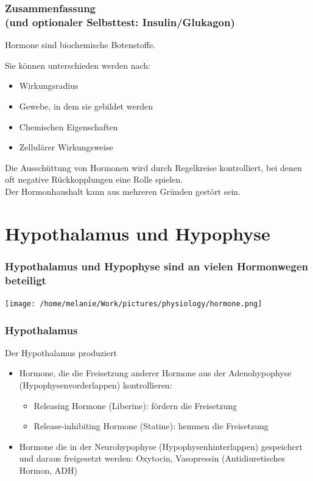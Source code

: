 \documentclass{beamer}
\begin{document}
\begin{frame}
\frametitle{Zusammenfassung \\ (und optionaler Selbsttest: Insulin/Glukagon)}

Hormone sind biochemische Botenstoffe. 

Sie können unterschieden werden nach:

\begin{itemize}
\item
Wirkungsradius
\item
Gewebe, in dem sie gebildet werden
\item
Chemischen Eigenschaften
\item
Zellulärer Wirkungsweise
\end{itemize}

Die Ausschüttung von Hormonen wird durch Regelkreise kontrolliert, bei denen oft negative Rückkopplungen eine Rolle spielen. \\

Der Hormonhaushalt kann aus mehreren Gründen gestört sein.

\end{frame}



\section{Hypothalamus und Hypophyse}

\begin{frame}
\frametitle{Hypothalamus und Hypophyse sind an vielen Hormonwegen beteiligt}

\begin{center}
\texttt{[image: /home/melanie/Work/pictures/physiology/hormone.png]}
\end{center}
\end{frame}


\begin{frame}
\frametitle{Hypothalamus}

Der Hypothalamus produziert 

\begin{itemize}
\item
Hormone, die die Freisetzung anderer Hormone aus der Adenohypophyse (Hypophysenvorderlappen) kontrollieren:
\pause
\begin{itemize}
\item
Releasing Hormone (Liberine): fördern die Freisetzung
\item
Release-inhibiting Hormone (Statine): hemmen die Freisetzung
\end{itemize}
\pause
\item
Hormone die in der Neurohypophyse (Hypophysenhinterlappen) gespeichert und daraus freigesetzt werden: Oxytocin, Vasopressin (Antidiuretisches Hormon, ADH)
\end{itemize}


\end{frame}
\end{document}

